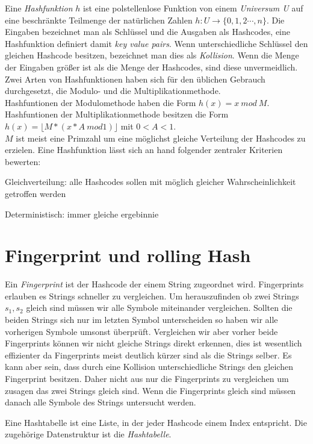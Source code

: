 Eine \emph{Hashfunktion} $h$ ist eine polstellenlose  Funktion von einem \emph{Universum U} auf eine beschränkte Teilmenge der natürlichen Zahlen $h:U \rightarrow \{0,1,2\cdots ,n \}$.
Die Eingaben bezeichnet man als Schlüssel und die Ausgaben als Hashcodes, eine Hashfunktion definiert  damit \emph{key value pairs}.
Wenn unterschiedliche Schlüssel den gleichen Hashcode besitzen, bezeichnet man dies als \emph{Kollision}.
Wenn die Menge der Eingaben größer ist als die Menge der Hashcodes, sind diese unvermeidlich.\\
Zwei Arten von Hashfunktionen  haben sich für den üblichen Gebrauch durchgesetzt, die Modulo- und die Multiplikationmethode.\\
Hashfuntionen der Modulomethode haben die Form $h(x)=x \  mod \  M$.
Hashfuntionen der Multiplikationmethode besitzen die Form $h(x)= \lfloor M * (x * A \ mod 1) \rfloor $ mit $0<A<1$.\\
$M$ ist meist eine Primzahl um eine möglichst gleiche Verteilung der Hashcodes zu erzielen.
Eine Hashfunktion lässt sich an hand folgender zentraler Kriterien bewerten:
\begin{enum}
	\item Gleichverteilung: alle Hashcodes sollen mit möglich gleicher Wahrscheinlichkeit getroffen werden
	\item Deterministisch: immer gleiche ergebinnie
\end{enum}
	
\section{Fingerprint und rolling Hash}

Ein \emph{Fingerprint} ist der Hashcode der einem String zugeordnet wird.
Fingerprints erlauben es Strings schneller zu vergleichen. 
Um herauszufinden ob zwei Strings $s_{1},s_{2}$ gleich sind müssen wir alle Symbole miteinander vergleichen.
Sollten die beiden Strings sich nur im letzten Symbol unterscheiden so haben wir alle vorherigen Symbole umsonst überprüft.
Vergleichen wir aber vorher beide Fingerprints können wir nicht gleiche Strings direkt erkennen, dies ist wesentlich effizienter da Fingerprints meist deutlich kürzer sind als die Strings selber.
Es kann aber sein, dass durch eine Kollision unterschiedliche Strings den gleichen Fingerprint besitzen.
Daher nicht aus nur die Fingerprints zu vergleichen um zusagen das zwei Strings gleich sind.
Wenn die Fingerprints gleich sind müssen danach alle Symbole des Strings untersucht werden.




Eine Hashtabelle ist eine Liste, in der jeder Hashcode einem Index entspricht.
Die zugehörige Datenstruktur ist die \emph{Hashtabelle}.
